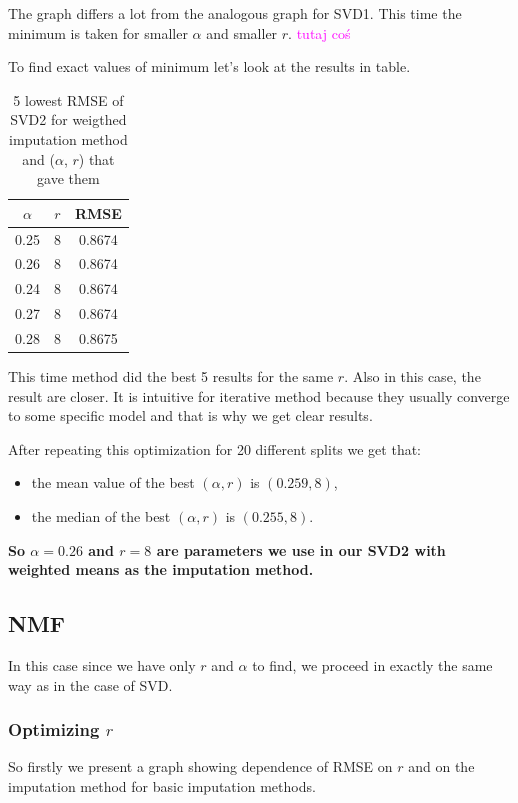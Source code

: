 \documentclass[11pt]{amsart}
\newcommand{\tami}[1]{{\textcolor{magenta}{#1}}}
\begin{document}
The graph differs a lot from the analogous graph for SVD1.
This time the minimum is taken for smaller $\alpha$ and smaller $r$.
\tami{tutaj coś}

To find exact values of minimum let's look at the results in table.

\begin{table}[H]
\begin{tabular}{cc|c}
$\alpha$ &  $r$ &     RMSE \\
\hline
       0.25 &  8 & 0.8674 \\
       0.26 &  8 & 0.8674 \\
       0.24 &  8 & 0.8674 \\
       0.27 &  8 & 0.8674 \\
       0.28 &  8 & 0.8675 \\
\end{tabular}
\caption{5 lowest RMSE of SVD2 for weigthed imputation method and ($\alpha$, $r$) that gave them}
\end{table}
This time method did the best 5 results for the same $r$.
Also in this case, the result are closer.
It is intuitive for iterative method because they usually converge to some specific model and that is why we get clear results.

After repeating this optimization for 20 different splits we get that:
\begin{itemize}
    \item the mean value of the best $(\alpha, r)$ is $(0.259, 8)$,
    \item the median of the best $(\alpha, r)$ is $(0.255, 8)$.
\end{itemize}
\textbf{So $\alpha = 0.26$ and $r=8$ are parameters we use in our SVD2 with weighted means as the imputation method.}

\subsection*{NMF}
In this case since we have only $r$ and $\alpha$ to find, we proceed in exactly the same way as in the case of SVD.

\subsubsection*{Optimizing $r$}
So firstly we present a graph showing dependence of RMSE on $r$ and on the imputation method for basic imputation methods.
\end{document}
